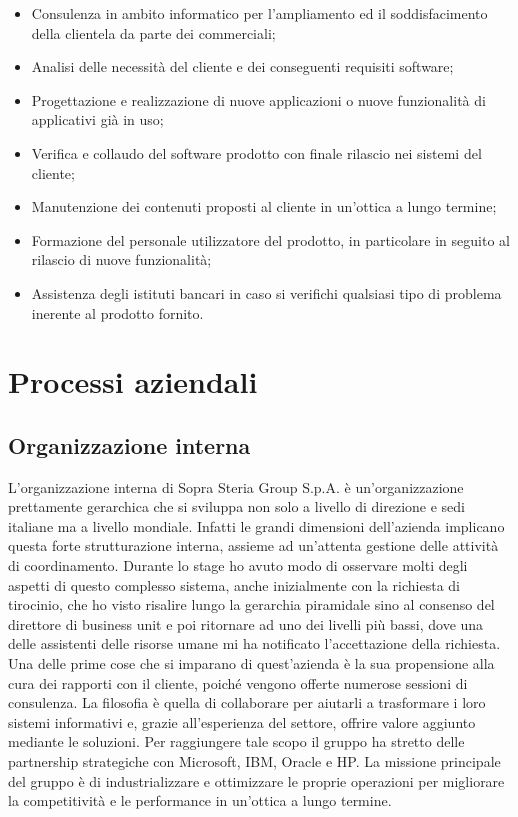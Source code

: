 	\begin{itemize}
		\item Consulenza in ambito informatico per l'ampliamento ed il soddisfacimento della clientela da parte dei commerciali;
		\item Analisi delle necessità del cliente e dei conseguenti requisiti software;
		\item Progettazione e realizzazione di nuove applicazioni o nuove funzionalità di applicativi già in uso;
		\item Verifica e collaudo del software prodotto con finale rilascio nei sistemi del cliente;
		\item Manutenzione dei contenuti proposti al cliente in un'ottica a lungo termine;
		\item Formazione del personale utilizzatore del prodotto, in particolare in seguito al rilascio di nuove funzionalità;
		\item Assistenza degli istituti bancari in caso si verifichi qualsiasi tipo di problema inerente al prodotto fornito.
	\end{itemize}	 

\section{Processi aziendali}

	\subsection{Organizzazione interna}
	
	L'organizzazione interna di Sopra Steria Group S.p.A. è un'organizzazione prettamente gerarchica	 che si sviluppa non solo a livello di direzione e sedi italiane ma a livello mondiale. Infatti le grandi dimensioni dell'azienda implicano questa forte strutturazione interna, assieme ad un'attenta gestione delle attività di coordinamento. Durante lo stage ho avuto modo di osservare molti degli aspetti di questo complesso sistema, anche inizialmente con la richiesta di tirocinio, che ho visto risalire lungo la gerarchia piramidale sino al consenso del direttore di business unit e poi ritornare ad uno dei livelli più bassi, dove una delle assistenti delle risorse umane mi ha notificato l'accettazione della richiesta.\\
	
	Una delle prime cose che si imparano di quest'azienda è la sua propensione alla cura dei rapporti con il cliente, poiché vengono offerte numerose sessioni	di consulenza. La filosofia è quella di collaborare per aiutarli a trasformare i loro sistemi informativi e, grazie all'esperienza del settore, offrire valore aggiunto mediante le soluzioni. Per raggiungere tale scopo il gruppo ha stretto delle partnership strategiche con Microsoft, IBM, Oracle e HP. La missione principale del gruppo è di industrializzare e ottimizzare le proprie operazioni per migliorare la competitività e le performance in un'ottica a lungo termine.\\
	
